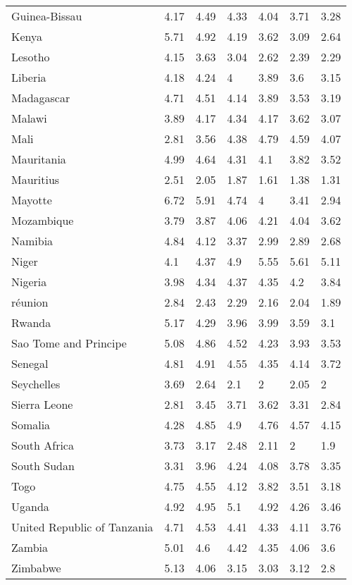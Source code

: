 \begin{longtable}[t]{lllllll}
Guinea-Bissau & 4.17 & 4.49 & 4.33 & 4.04 & 3.71 & 3.28\\
Kenya & 5.71 & 4.92 & 4.19 & 3.62 & 3.09 & 2.64\\
Lesotho & 4.15 & 3.63 & 3.04 & 2.62 & 2.39 & 2.29\\
Liberia & 4.18 & 4.24 & 4 & 3.89 & 3.6 & 3.15\\
Madagascar & 4.71 & 4.51 & 4.14 & 3.89 & 3.53 & 3.19\\
Malawi & 3.89 & 4.17 & 4.34 & 4.17 & 3.62 & 3.07\\
Mali & 2.81 & 3.56 & 4.38 & 4.79 & 4.59 & 4.07\\
Mauritania & 4.99 & 4.64 & 4.31 & 4.1 & 3.82 & 3.52\\
Mauritius & 2.51 & 2.05 & 1.87 & 1.61 & 1.38 & 1.31\\
Mayotte & 6.72 & 5.91 & 4.74 & 4 & 3.41 & 2.94\\
Mozambique & 3.79 & 3.87 & 4.06 & 4.21 & 4.04 & 3.62\\
Namibia & 4.84 & 4.12 & 3.37 & 2.99 & 2.89 & 2.68\\
Niger & 4.1 & 4.37 & 4.9 & 5.55 & 5.61 & 5.11\\
Nigeria & 3.98 & 4.34 & 4.37 & 4.35 & 4.2 & 3.84\\
réunion & 2.84 & 2.43 & 2.29 & 2.16 & 2.04 & 1.89\\
Rwanda & 5.17 & 4.29 & 3.96 & 3.99 & 3.59 & 3.1\\
Sao Tome and Principe & 5.08 & 4.86 & 4.52 & 4.23 & 3.93 & 3.53\\
Senegal & 4.81 & 4.91 & 4.55 & 4.35 & 4.14 & 3.72\\
Seychelles & 3.69 & 2.64 & 2.1 & 2 & 2.05 & 2\\
Sierra Leone & 2.81 & 3.45 & 3.71 & 3.62 & 3.31 & 2.84\\
Somalia & 4.28 & 4.85 & 4.9 & 4.76 & 4.57 & 4.15\\
South Africa & 3.73 & 3.17 & 2.48 & 2.11 & 2 & 1.9\\
South Sudan & 3.31 & 3.96 & 4.24 & 4.08 & 3.78 & 3.35\\
Togo & 4.75 & 4.55 & 4.12 & 3.82 & 3.51 & 3.18\\
Uganda & 4.92 & 4.95 & 5.1 & 4.92 & 4.26 & 3.46\\
United Republic of Tanzania & 4.71 & 4.53 & 4.41 & 4.33 & 4.11 & 3.76\\
Zambia & 5.01 & 4.6 & 4.42 & 4.35 & 4.06 & 3.6\\
Zimbabwe & 5.13 & 4.06 & 3.15 & 3.03 & 3.12 & 2.8\\*
\end{longtable}
\endgroup{}
